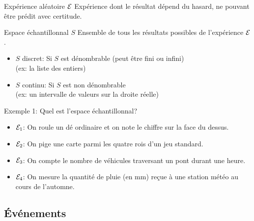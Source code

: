 \documentclass{BeamerTemplate}
\begin{document}
\begin{frame}[t]%

 \begin{Boite}{Expérience aléatoire $\cal{E}$}
Expérience dont le résultat dépend du hasard, ne pouvant  être prédit avec certitude.
\end{Boite}

 \begin{Boite}{Espace échantillonnal $S$}
Ensemble de tous les résultats possibles de l'expérience ${\cal{E}}$.
\end{Boite}


 \medskip
\begin{itemize}
\item \alert{$S$ discret}:
 Si $S$ est dénombrable (peut être fini ou infini) \\(ex: la liste des entiers)

\item \alert{$S$ continu}:
 Si $S$ est  non dénombrable \\(ex: un intervalle de valeurs sur la droite réelle)
 \end{itemize}


\end{frame}

\begin{frame}[t]{Exemple 1: Quel est l'espace échantillonnal?}

 \begin{itemize}\itemsep 10mm
  \item<1-> ${\cal{E}}_1$: On roule un dé ordinaire et on note le chiffre sur la
  face du dessus.%
  \item<1-> ${\cal{E}}_2$: On pige une carte parmi les quatre rois d'un jeu standard.
  \item<1-> ${\cal{E}}_3$: On compte le nombre de véhicules traversant un pont durant
  une heure. %
  \item<1-> ${\cal{E}}_4$: On mesure la quantité de pluie (en mm) reçue à une station
  météo au cours de l'automne. %
 \end{itemize}
\end{frame}

\subsection{Événements}
\end{document}

